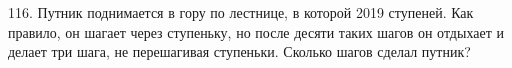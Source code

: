 116. Путник поднимается в гору по лестнице, в которой 2019 ступеней. Как правило, он шагает через ступеньку, но после десяти таких шагов он отдыхает и делает три шага, не перешагивая ступеньки. Сколько шагов сделал путник?\\
